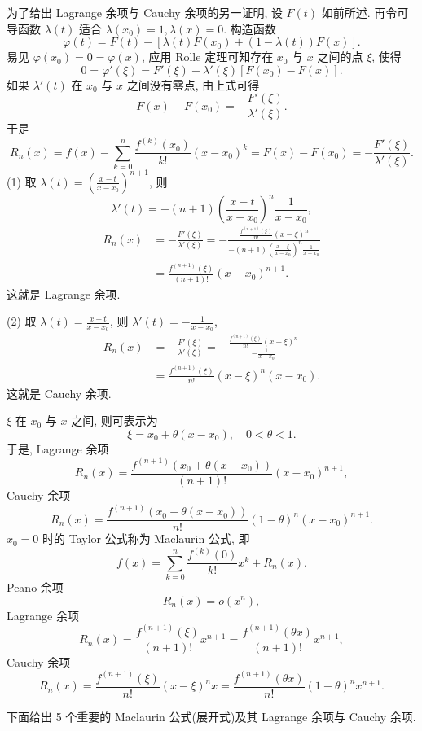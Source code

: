 \begin{remark}\label{rem:4.1.1}
为了给出 Lagrange 余项与 Cauchy 余项的另一证明, 设 $F(t)$ 如前所述. 再令可导函数 $\lambda(t)$ 适合 $\lambda(x_{0})=1, \lambda(x)=0$. 构造函数
\[
\varphi(t)=F(t)-\left[\lambda(t)F(x_{0})+(1-\lambda(t))F(x)\right].
\]
易见 $\varphi(x_{0})=0=\varphi(x)$, 应用 Rolle 定理可知存在 $x_{0}$ 与 $x$ 之间的点 $\xi$, 使得
\[
0=\varphi'(\xi)=F'(\xi)-\lambda'(\xi)\left[F(x_{0})-F(x)\right].
\]
如果 $\lambda'(t)$ 在 $x_{0}$ 与 $x$ 之间没有零点, 由上式可得
\[
F(x)-F(x_{0})=-\frac{F'(\xi)}{\lambda'(\xi)}.
\]
于是
\[
R_{n}(x)=f(x)-\sum_{k=0}^{n}\frac{f^{(k)}(x_{0})}{k!}(x-x_{0})^{k}=F(x)-F(x_{0})=-\frac{F'(\xi)}{\lambda'(\xi)}.
\]
(1) 取 $\lambda(t)=\left(\frac{x-t}{x-x_{0}}\right)^{n+1}$, 则
\[
\lambda'(t)=-(n+1)\left(\frac{x-t}{x-x_{0}}\right)^{n}\frac{1}{x-x_{0}},
\]
\begin{align*}
R_{n}(x)&=-\frac{F'(\xi)}{\lambda'(\xi)}=-\frac{\frac{f^{(n+1)}(\xi)}{n!}(x-\xi)^{n}}{-(n+1)\left(\frac{x-\xi}{x-x_{0}}\right)^{n}\frac{1}{x-x_{0}}}\\
&=\frac{f^{(n+1)}(\xi)}{(n+1)!}(x-x_{0})^{n+1}.
\end{align*}
这就是 Lagrange 余项.

(2) 取 $\lambda(t)=\frac{x-t}{x-x_{0}}$, 则 $\lambda'(t)=-\frac{1}{x-x_{0}}$,
\begin{align*}
R_{n}(x)&=-\frac{F'(\xi)}{\lambda'(\xi)}=-\frac{\frac{f^{(n+1)}(\xi)}{n!}(x-\xi)^{n}}{-\frac{1}{x-x_{0}}}\\
&=\frac{f^{(n+1)}(\xi)}{n!}(x-\xi)^{n}(x-x_{0}).
\end{align*}
这就是 Cauchy 余项.
\end{remark}

\begin{remark}\label{rem:4.1.2}
$\xi$ 在 $x_{0}$ 与 $x$ 之间, 则可表示为
\[
\xi=x_{0}+\theta(x-x_{0}),\quad 0<\theta<1.
\]
于是, Lagrange 余项
\[
R_{n}(x)=\frac{f^{(n+1)}(x_{0}+\theta(x-x_{0}))}{(n+1)!}(x-x_{0})^{n+1},
\]
Cauchy 余项
\[
R_{n}(x)=\frac{f^{(n+1)}(x_{0}+\theta(x-x_{0}))}{n!}(1-\theta)^{n}(x-x_{0})^{n+1}.
\]
$x_{0}=0$ 时的 Taylor 公式称为 Maclaurin 公式, 即
\[
f(x)=\sum_{k=0}^{n}\frac{f^{(k)}(0)}{k!}x^{k}+R_{n}(x).
\]
Peano 余项
\[
R_{n}(x)=o(x^{n}),
\]
Lagrange 余项
\[
R_{n}(x)=\frac{f^{(n+1)}(\xi)}{(n+1)!}x^{n+1}=\frac{f^{(n+1)}(\theta x)}{(n+1)!}x^{n+1},
\]
Cauchy 余项
\[
R_{n}(x)=\frac{f^{(n+1)}(\xi)}{n!}(x-\xi)^{n}x=\frac{f^{(n+1)}(\theta x)}{n!}(1-\theta)^{n}x^{n+1}.
\]
\end{remark}

下面给出 5 个重要的 Maclaurin 公式(展开式)及其 Lagrange 余项与 Cauchy 余项.

